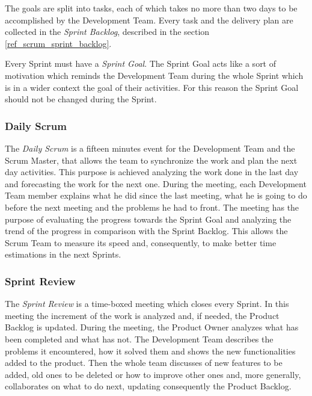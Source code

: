 			The goals are split into tasks, each of which takes no more than two days to be accomplished by the Development Team. Every task and the delivery plan are collected in the \emph{Sprint Backlog}, described in the section \ref{ref_scrum_sprint_backlog}.

			Every Sprint must have a \emph{Sprint Goal}. The Sprint Goal acts like a sort of motivation which reminds the Development Team during the whole Sprint which is in a wider context the goal of their activities. For this reason the Sprint Goal should not be changed during the Sprint.
		
			\subsubsection{Daily Scrum}\label{ref_scrum_daily}
			The \emph{Daily Scrum} is a fifteen minutes event for the Development Team and the Scrum Master, that allows the team to synchronize the work and plan the next day activities. This purpose is achieved analyzing the work done in the last day and forecasting the work for the next one. 
			During the meeting, each Development Team member explains what he did since the last meeting, what he is going to do before the next meeting and the problems he had to front.
			The meeting has the purpose of evaluating the progress towards the Sprint Goal and analyzing the trend of the progress in comparison with the Sprint Backlog. This allows the Scrum Team to measure its speed and, consequently, to make better time estimations in the next Sprints. 

			\subsubsection{Sprint Review}\label{ref_scrum_sprint_rev}
			The \emph{Sprint Review} is a time-boxed meeting which closes every Sprint. In this meeting the increment of the work is analyzed and, if needed, the Product Backlog is updated. 
			During the meeting, the Product Owner analyzes what has been completed and what has not. The Development Team describes the problems it encountered, how it solved them and shows the new functionalities added to the product. Then the whole team discusses of new features to be added, old ones to be deleted or how to improve other ones and, more generally, collaborates on what to do next, updating consequently the Product Backlog.			

